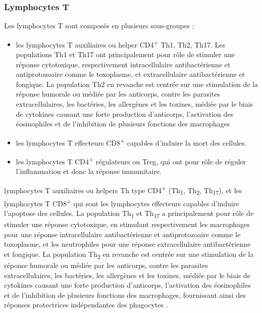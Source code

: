\documentclass[
  a4paper,
  DIV=11,
  numbers=noendperiod,
  listof=totoc]{scrreprt}
\begin{document}
\subsubsection{Lymphocytes T}\label{lymphocytes-t}

Les lymphocytes T sont composés en plusieurs sous-groupes :

\begin{itemize}
\item
  les lymphocytes T auxiliaires ou helper CD4\textsuperscript{+} Th1,
  Th2, Th17. Les populations \ac{Th1} et \ac{Th17} ont principalement
  pour rôle de stimuler une réponse cytotoxique, respectivement
  intracellulaire antibactérienne et antiprotozoaire comme le
  toxoplasme, et extracellulaire antibactérienne et fongique. La
  population \ac{Th2} en revanche est centrée sur une stimulation de la
  réponse humorale ou médiée par les anticorps, contre les parasites
  extracellulaires, les bactéries, les allergènes et les toxines, médiée
  par le biais de cytokines causant une forte production d'anticorps,
  l'activation des éosinophiles et de l'inhibition de plusieurs
  fonctions des macrophages
\item
  les lymphocytes T effecteurs CD8\textsuperscript{+} capables d'induire
  la mort des cellules.
\item
  les lymphocytes T CD4\textsuperscript{+} régulateurs ou \ac{Treg}, qui
  ont pour rôle de réguler l'inflammation et donc la réponse
  immunitaire.
\end{itemize}

lymphocytes T auxiliaires ou helpers \acs{Th} type
CD4\textsuperscript{+} (Th\textsubscript{1}, Th\textsubscript{2},
Th\textsubscript{17}), et les lymphocytes T CD8\textsuperscript{+} qui
sont les lymphocytes effecteurs capables d'induire l'apoptose des
cellules. La population Th\textsubscript{1} et Th\textsubscript{17} a
principalement pour rôle de stimuler une réponse cytotoxique, en
stimulant respectivement les macrophages pour une réponse
intracellulaire antibactérienne et antiprotozoaire comme le toxoplasme,
et les neutrophiles pour une réponse extracellulaire antibactérienne et
fongique. La population Th\textsubscript{2} en revanche est centrée sur
une stimulation de la réponse humorale ou médiée par les anticorps,
contre les parasites extracellulaires, les bactéries, les allergènes et
les toxines, médiée par le biais de cytokines causant une forte
production d'anticorps, l'activation des éosinophiles et de l'inhibition
de plusieurs fonctions des macrophages, fournissant ainsi des réponses
protectrices indépendantes des phagocytes
\autocite{Cantorna.2015,Walker.2018}.
\end{document}
